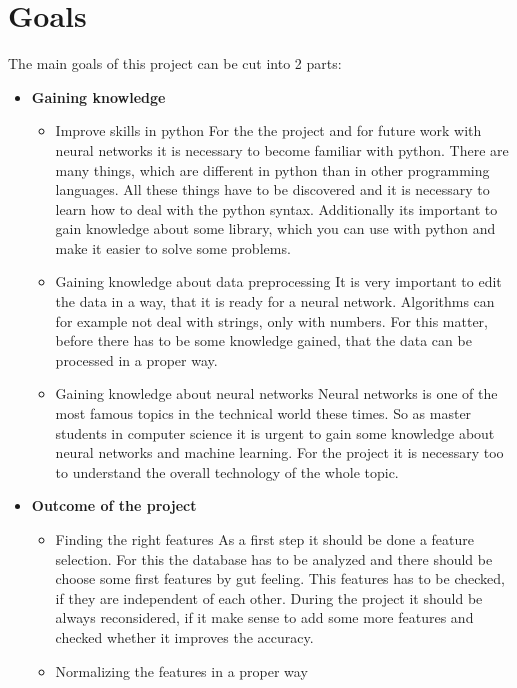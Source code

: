 \section{Goals}
The main goals of this project can be cut into 2 parts:
\begin{itemize}
	\item \textbf{Gaining knowledge}
		\begin{itemize}
			\item Improve skills in python\newline
			For the the project and for future work with neural networks it is necessary to become familiar with python. There are many things, which are different in python than in other programming languages. All these things have to be discovered and it is necessary to learn how to deal with the python syntax. Additionally its important to gain knowledge about some library, which you can use with python and make it easier to solve some problems.
			\item Gaining knowledge about data preprocessing\newline 
			It is very important to edit the data in a way, that it is ready for a neural network. Algorithms can for example not deal with strings, only with numbers. For this matter, before there has to be some knowledge gained, that the data can be processed in a proper way.
			\item Gaining knowledge about neural networks\newline
			Neural networks is one of the most famous topics in the technical world these times. So as master students in computer science it is urgent to gain some knowledge about neural networks and machine learning. For the project it is necessary too to understand the overall technology of the whole topic. 
		\end{itemize}
	\item \textbf{Outcome of the project}
		\begin{itemize}
			\item Finding the right features \newline
			As a first step it should be done a feature selection. For this the database has to be analyzed and there should be choose some first features by gut feeling. This features has to be checked, if they are independent of each other. During the project it should be always reconsidered, if it make sense to add some more features and checked whether it improves the accuracy. 
			\item Normalizing the features in a proper way \newline

\end{itemize}
\end{itemize}
